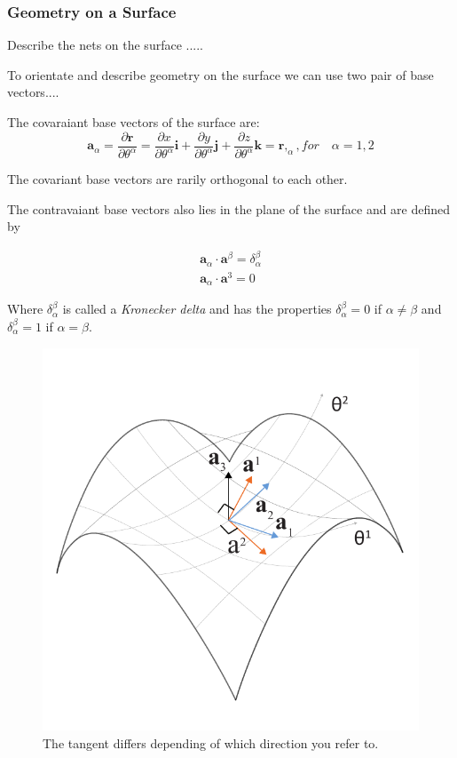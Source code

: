 \subsubsection{Geometry on a Surface}

Describe the nets on the surface .....

To orientate and describe geometry on the surface we can use two pair of base vectors....

The covaraiant base vectors of the surface are:
\begin{equation} \label{convariantDiff}
 \textbf{a}_\alpha = \frac{\partial\textbf{r}}{\partial \theta^\alpha } = \frac{\partial x}{\partial \theta^\alpha }\textbf{i} + \frac{\partial y}{\partial \theta^\alpha }\textbf{j}+\frac{\partial z}{\partial \theta^\alpha }\textbf{k} = \textbf{r},_{\alpha} , for\quad \alpha = 1,2
\end{equation}


The covariant base vectors are rarily orthogonal to each other.

The contravaiant base vectors also lies in the plane of the surface and are defined by

\begin{align}
\textbf{a}_{\alpha} \cdot \textbf{a}^\beta = \delta^{\beta}_\alpha \\
\textbf{a}_{\alpha} \cdot \textbf{a}^3 = 0    
\end{align}

Where $\delta^{\beta}_\alpha$ is called a \textit{Kronecker delta} and has the properties $\delta^{\beta}_\alpha = 0$ if $\alpha \neq  \beta$ and $\delta^{\beta}_\alpha = 1$ if $\alpha =  \beta$. 
 
\begin{figure}[H]
\centering
\includegraphics[width=0.7\linewidth ]{figure/Theory/surfGeometry2.pdf}
\caption{The tangent differs depending of which direction you refer to. }
\end{figure}
 
